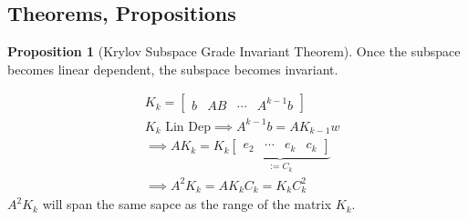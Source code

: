 \documentclass[]{article}
\theoremstyle{definition}
\newtheorem{prop}{Proposition}[section]  %
\begin{document}
    \subsection{Theorems, Propositions}
        \begin{prop}[Krylov Subspace Grade Invariant Theorem]\label{prop:Krylov_Subspace_Grade_Invariant_Theorem}
            Once the subspace becomes linear dependent, the subspace becomes invariant. 
        \end{prop}
        \begin{align}
            & K_k = \begin{bmatrix}
                b & AB & \cdots & A^{k - 1}b
            \end{bmatrix}
            \\
            & K_k \text{ Lin Dep} \implies A^{k-1}b = AK_{k - 1}w
            \\
            & \implies 
            AK_k = K_k
                \underbrace{\begin{bmatrix}
                    e_2 & \cdots & e_k & c_k
                \end{bmatrix}}_{:= C_k}
            \\
            & \implies 
            A^2K_k = AK_kC_k = K_kC_k^2
        \end{align}
        $A^2K_k$ will span the same sapce as the range of the matrix $K_k$. 
\newpage


            
\end{document}
